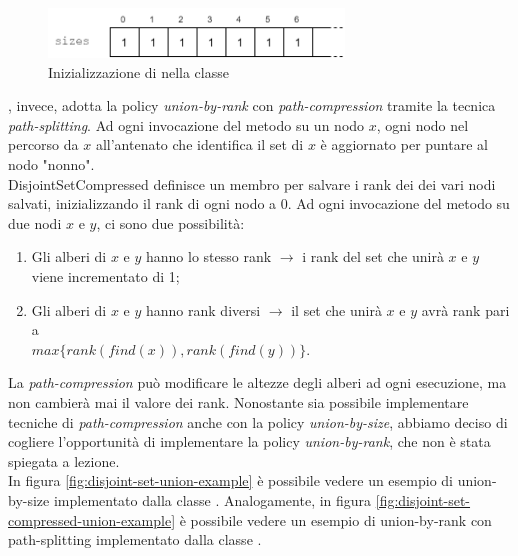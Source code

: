 \begin{figure}[htbp]
	\centering
    \includegraphics[width=0.7\textwidth]{./images/DisjointSetSizesVector.png}
	\caption{Inizializzazione di  nella classe }
	\label{fig:disjoint-set-sizes}
\end{figure}

\noindent {}, invece, adotta la policy \textit{union-by-rank} con \textit{path-compression} tramite la tecnica \textit{path-splitting}.
Ad ogni invocazione del metodo  su un nodo $x$, ogni nodo nel percorso da $x$ all'antenato che identifica il set di $x$ è aggiornato per puntare al nodo "nonno". \\
\noindent DisjointSetCompressed definisce un membro  per salvare i rank dei dei vari nodi salvati, inizializzando il rank di ogni nodo a 0. Ad ogni invocazione del metodo  su due nodi $x$ e $y$, ci sono due possibilità:

\begin{enumerate}
    \item Gli alberi di $x$ e $y$ hanno lo stesso rank $\rightarrow{}$ i rank del set che unirà $x$ e $y$ viene incrementato di 1;
    \item Gli alberi di $x$ e $y$ hanno rank diversi $\rightarrow{}$ il set che unirà $x$ e $y$ avrà rank pari a \\ $max\{ rank(find(x)), rank(find(y)) \}$.
\end{enumerate}

\noindent La \textit{path-compression} può modificare le altezze degli alberi ad ogni esecuzione, ma non cambierà mai il valore dei rank.
Nonostante sia possibile implementare tecniche di \textit{path-compression} anche con la policy \textit{union-by-size}, abbiamo deciso di cogliere l'opportunità di implementare la policy \textit{union-by-rank}, che non è stata spiegata a lezione. \\

\noindent In figura \ref{fig:disjoint-set-union-example} è possibile vedere un esempio di union-by-size implementato dalla classe . Analogamente, in figura \ref{fig:disjoint-set-compressed-union-example} è possibile vedere un esempio di union-by-rank con path-splitting implementato dalla classe .

